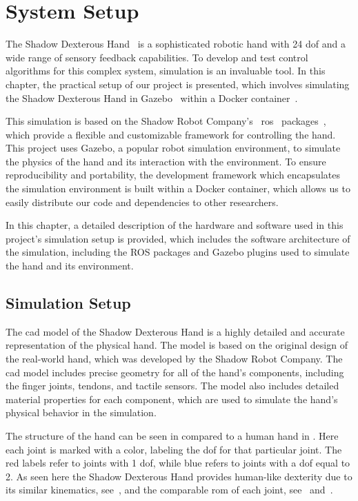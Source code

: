 \chapter{System Setup} \label{ch:system-setup}

The Shadow Dexterous Hand~\cite{shadow-dex-hand} is a sophisticated robotic hand with \num{24} \gls{dof} and a wide range of sensory feedback capabilities. To develop and test control algorithms for this complex system, simulation is an invaluable tool. In this chapter, the practical setup of our project is presented, which involves simulating the Shadow Dexterous Hand in Gazebo~\cite{gazebo} within a Docker container~\cite{docker}. \medskip

This simulation is based on the Shadow Robot Company's~\cite{shadow-robotics} \gls{ros}~\cite{ros} packages~\cite{shadow-ros-packages}, which provide a flexible and customizable framework for controlling the hand. This project uses Gazebo, a popular robot simulation environment, to simulate the physics of the hand and its interaction with the environment. To ensure reproducibility and portability, the development framework which encapsulates the simulation environment is built within a Docker container, which allows us to easily distribute our code and dependencies to other researchers. \medskip

In this chapter, a detailed description of the hardware and software used in this project's simulation setup is provided, which includes the software architecture of the simulation, including the ROS packages and Gazebo plugins used to simulate the hand and its environment.


\section{Simulation Setup} \label{sec:system-setup-simulation-setup}

The \gls{cad} model of the Shadow Dexterous Hand is a highly detailed and accurate representation of the physical hand. The model is based on the original design of the real-world hand, which was developed by the Shadow Robot Company. The \gls{cad} model includes precise geometry for all of the hand's components, including the finger joints, tendons, and tactile sensors. The model also includes detailed material properties for each component, which are used to simulate the hand's physical behavior in the simulation.\medskip

The structure of the hand can be seen in  compared to a human hand in . Here each joint is marked with a color, labeling the \gls{dof} for that particular joint. The red labels refer to joints with \num{1} \gls{dof}, while blue refers to joints with a \gls{dof} equal to \num{2}. As seen here the Shadow Dexterous Hand provides human-like dexterity due to its similar kinematics, see~, and the comparable \gls{rom} of each joint, see~ and~.


